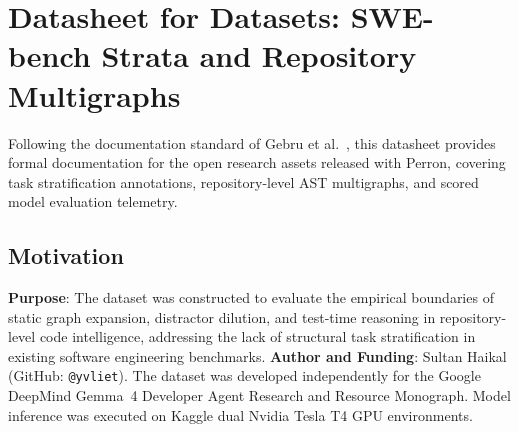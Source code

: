 \section{Datasheet for Datasets: SWE-bench Strata and Repository Multigraphs}
\label{app:datasheet}

Following the documentation standard of Gebru et al.~\cite{gebru2021datasheets}, this datasheet provides formal documentation for the open research assets released with Perron, covering task stratification annotations, repository-level AST multigraphs, and scored model evaluation telemetry.

\subsection{Motivation}
\textbf{Purpose}: The dataset was constructed to evaluate the empirical boundaries of static graph expansion, distractor dilution, and test-time reasoning in repository-level code intelligence, addressing the lack of structural task stratification in existing software engineering benchmarks.
\textbf{Author and Funding}: Sultan Haikal (GitHub: \texttt{@yvliet}). The dataset was developed independently for the Google DeepMind Gemma~4 Developer Agent Research and Resource Monograph. Model inference was executed on Kaggle dual Nvidia Tesla T4 GPU environments.

